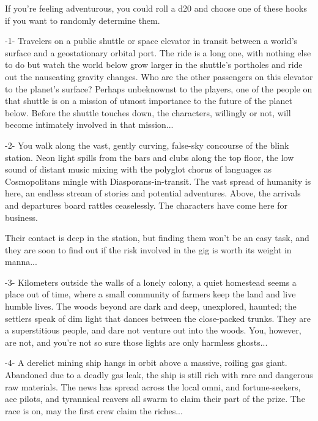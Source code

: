 If you’re feeling adventurous, you could roll a d20 and choose one of these hooks if you want to  
randomly determine them.
 

                                                     -1-  
Travelers on a public shuttle or space elevator in transit between a world’s surface and a  
geostationary orbital port. The ride is a long one, with nothing else to do but watch the world  
below grow larger in the shuttle’s portholes and ride out the nauseating gravity changes. Who are  
the other passengers on this elevator to the planet’s surface? Perhaps unbeknownst to the  
players, one of the people on that shuttle is on a mission of utmost importance to the future of  
the planet below. Before the shuttle touches down, the characters, willingly or not, will become  
intimately involved in that mission...  

                                                     -2-  
You walk along the vast, gently curving, false-sky concourse of the blink station. Neon light spills  
from the bars and clubs along the top floor, the low sound of distant music mixing with the  
polyglot chorus of languages as Cosmopolitans mingle with Diasporans-in-transit. The vast  
spread of humanity is here, an endless stream of stories and potential adventures. Above, the  
arrivals and departures board rattles ceaselessly. The characters have come here for business.  

                                                                                                          


Their contact is deep in the station, but finding them won’t be an easy task, and they are soon to  
find out if the risk involved in the gig is worth its weight in manna...   

                                                     -3-  
Kilometers outside the walls of a lonely colony, a quiet homestead seems a place out of time,  
where a small community of farmers keep the land and live humble lives. The woods beyond are  
dark and deep, unexplored, haunted; the settlers speak of dim light that dances between the  
close-packed trunks. They are a superstitious people, and dare not venture out into the woods.  
You, however, are not, and you’re not so sure those lights are only harmless ghosts...  

                                                     -4-  
A derelict mining ship hangs in orbit above a massive, roiling gas giant. Abandoned due to a  
deadly gas leak, the ship is still rich with rare and dangerous raw materials. The news has spread  
across the local omni, and fortune-seekers, ace pilots, and tyrannical reavers all swarm to claim  
their part of the prize. The race is on, may the first crew claim the riches...  

